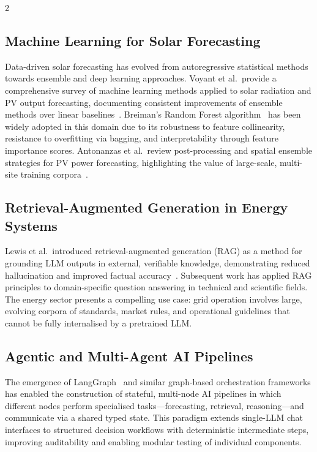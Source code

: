 \documentclass[11pt]{article}
\begin{document}
\begin{multicols}{2}
\subsection{Machine Learning for Solar Forecasting}

Data-driven solar forecasting has evolved from autoregressive statistical
methods towards ensemble and deep learning approaches. Voyant et al.\ provide
a comprehensive survey of machine learning methods applied to solar radiation
and PV output forecasting, documenting consistent improvements of ensemble
methods over linear baselines~\cite{voyant2017}. Breiman's Random Forest
algorithm~\cite{breiman2001} has been widely adopted in this domain due to its
robustness to feature collinearity, resistance to overfitting via bagging, and
interpretability through feature importance scores. Antonanzas et al.\ review
post-processing and spatial ensemble strategies for PV power forecasting,
highlighting the value of large-scale, multi-site training corpora~\cite{antonanzas2016}.

\subsection{Retrieval-Augmented Generation in Energy Systems}

Lewis et al.\ introduced retrieval-augmented generation (RAG) as a method for
grounding LLM outputs in external, verifiable knowledge, demonstrating reduced
hallucination and improved factual accuracy~\cite{lewis2020}. Subsequent work
has applied RAG principles to domain-specific question answering in technical
and scientific fields. The energy sector presents a compelling use case: grid
operation involves large, evolving corpora of standards, market rules, and
operational guidelines that cannot be fully internalised by a pretrained LLM.

\subsection{Agentic and Multi-Agent AI Pipelines}

The emergence of LangGraph~\cite{langchain2024} and similar graph-based
orchestration frameworks has enabled the construction of stateful, multi-node
AI pipelines in which different nodes perform specialised tasks---forecasting,
retrieval, reasoning---and communicate via a shared typed state. This paradigm
extends single-LLM chat interfaces to structured decision workflows with
deterministic intermediate steps, improving auditability and enabling modular
testing of individual components.


\end{multicols}
\end{document}

